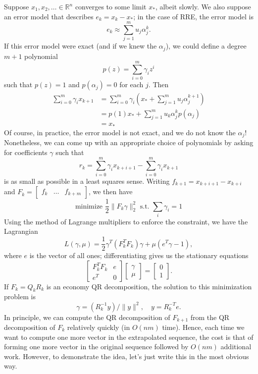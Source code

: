 \documentclass[12pt, leqno]{article} %
\begin{document}
Suppose \(x_1, x_2, \ldots \in \mathbb{R}^n\) converges to some limit
\(x_*\), albeit slowly. We also suppose an error model that describes
\(e_k = x_k-x_*\); in the case of RRE, the error model is
\[e_k \approx \sum_{j=1}^m u_j \alpha_j^k.\] If this error model were
exact (and if we knew the \(\alpha_j\)), we could define a degree
\(m+1\) polynomial \[p(z) = \sum_{i=0}^m \gamma_i z^i\] such that
\(p(z) = 1\) and \(p(\alpha_j) = 0\) for each \(j\). Then \begin{align*}
  \sum_{i=0}^m \gamma_i x_{k+1}
  &= \sum_{i=0}^m \gamma_i \left( x_* + \sum_{j=1}^m u_j \alpha_j^{k+1} \right) \\
  &= p(1) x_* + \sum_{j=1}^m u_k \alpha_j^k p(\alpha_j) \\
  &= x_*
\end{align*} Of course, in practice, the error model is not exact, and
we do not know the \(\alpha_j\)! Nonetheless, we can come up with an
appropriate choice of polynomials by asking for coefficients \(\gamma\)
such that
\[r_k = \sum_{i=0}^m \gamma_i x_{k+i+1} - \sum_{i=0}^m \gamma_i x_{k+1}\]
is as small as possible in a least squares sense. Writing
\(f_{k+1} = x_{k+i+1}-x_{k+i}\) and
\(F_k = \begin{bmatrix} f_k & \ldots & f_{k+m} \end{bmatrix}\), we then
have \[\mbox{minimize } \frac{1}{2} \|F_k\gamma\|_2^2 
  \mbox{ s.t. } \sum_i \gamma_i = 1\] Using the method of Lagrange
multipliers to enforce the constraint, we have the Lagrangian
\[L(\gamma, \mu) = \frac{1}{2} \gamma^T (F_k^T F_k) \gamma + \mu (e^T \gamma - 1),\]
where \(e\) is the vector of all ones; differentiating gives us the
stationary equations
\[\begin{bmatrix} F_k^T F_k & e \\ e^T & 0 \end{bmatrix}
  \begin{bmatrix} \gamma \\ \mu \end{bmatrix} =
  \begin{bmatrix} 0 \\ 1 \end{bmatrix}.\] If \(F_k = Q_k R_k\) is an
economy QR decomposition, the solution to this minimization problem is
\[\gamma = (R_k^{-1} y)/\|y\|^2, \quad y = R_k^{-T} e.\] In principle,
we can compute the QR decomposition of \(F_{k+1}\) from the QR
decomposition of \(F_k\) relatively quickly (in \(O(nm)\) time). Hence,
each time we want to compute one more vector in the extrapolated
sequence, the cost is that of forming one more vector in the original
sequence followed by \(O(nm)\) additional work. However, to demonstrate
the idea, let's just write this in the most obvious way.
\end{document}
